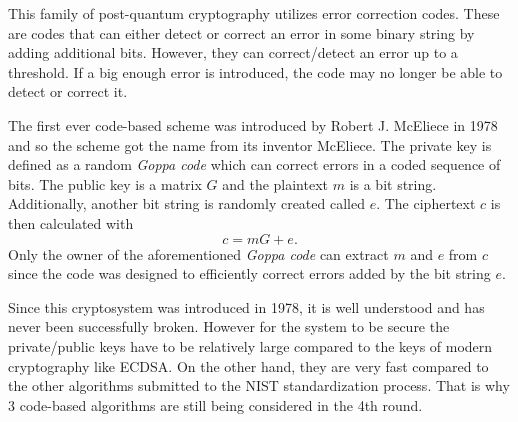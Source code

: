 This family of post-quantum cryptography utilizes error correction codes. These are codes that can either detect or correct an error in some binary string by adding additional bits. However, they can correct/detect an error up to a threshold. If a big enough error is introduced, the code may no longer be able to detect or correct it.

The first ever code-based scheme was introduced by Robert J. McEliece in 1978 and so the scheme got the name from its inventor McEliece. The private key is defined as a random \textit{Goppa code} which can correct errors in a coded sequence of bits. The public key is a matrix $G$ and the plaintext $m$ is a bit string. Additionally, another bit string is randomly created called $e$. The ciphertext $c$ is then calculated with
\begin{equation}
  c=mG+e.
\end{equation}
Only the owner of the aforementioned \textit{Goppa code} can extract $m$ and $e$ from $c$ since the code was designed to efficiently correct errors added by the bit string $e$. \cite{Bernstein149}

Since this cryptosystem was introduced in 1978, it is well understood and has never been successfully broken. However for the system to be secure the private/public keys have to be relatively large compared to the keys of modern cryptography like ECDSA. On the other hand, they are very fast compared to the other algorithms submitted to the NIST standardization process. That is why 3 code-based algorithms are still being considered in the 4th round. \cite{Chen2016}
